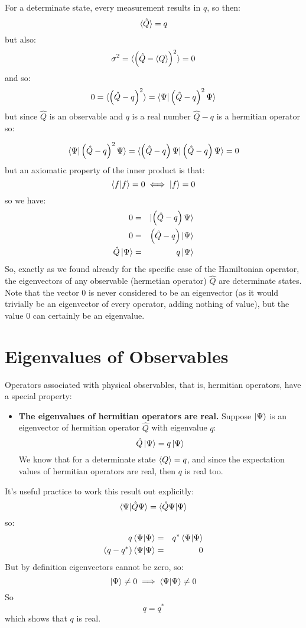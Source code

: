 \documentclass[12pt]{book}
\begin{document}
For a determinate state, every measurement results in $q$, so then:
$$\braket{\hat{Q}} = q$$
but also:
$$\sigma^2 = \braket{\left(\hat{Q}-\braket{Q}\right)^2} = 0$$
and so:
$$0 = \braket{\left(\hat{Q}-q\right)^2} = \braket{\Psi|\left(\hat{Q}-q\right)^2\Psi}$$
but since $\hat{Q}$ is an observable and $q$ is a real number $\hat{Q}-q$ is a hermitian operator so:

$$\braket{\Psi|\left(\hat{Q}-q\right)^2\Psi} = \braket{\left(\hat{Q}-q\right)\Psi|\left(\hat{Q}-q\right)\Psi} = 0$$
but an axiomatic property of the inner product is that:
$$\braket{f|f} = 0 \iff \ket{f} = 0$$
so we have:
\begin{eqnarray*}
 0 &=& \ket{\left(\hat{Q}-q\right)\Psi}\\
 0 &=& \left(\hat{Q}-q\right)\ket{\Psi}\\
\hat{Q}\ket{\Psi} &=& q \ket{\Psi}\\
\end{eqnarray*}
So, exactly as we found already for the specific case of the Hamiltonian operator, the eigenvectors of any observable (hermetian operator) $\hat{Q}$ are determinate states.
Note that the vector $0$ is never considered to be an eigenvector (as
it would trivially be an eigenvector of every operator, adding nothing
of value), but the value $0$ can certainly be an eigenvalue.  

\section{Eigenvalues of Observables}

Operators associated with physical observables, that is, hermitian operators, have a special property:
\begin{itemize}
\item {\bf The eigenvalues of hermitian operators are real.}  Suppose $\ket{\Psi}$ is an eigenvector of hermitian operator $\hat{Q}$ with eigenvalue $q$:
$$\hat{Q}\ket{\Psi} = q \ket{\Psi}$$
We know that for a determinate state $\braket{Q} = q$, and since the expectation values of hermitian operators are real, then $q$ is real too.  
\end{itemize}

\noindent
It's useful practice to work this result out explicitly:
$$\braket{\Psi | \hat{Q} \Psi} = \braket{\hat{Q} \Psi | \Psi}$$
so:
\begin{eqnarray*}
q \braket{\Psi | \Psi} &=& q^* \braket{\Psi | \Psi}\\
(q-q^*) \braket{\Psi | \Psi} &=& 0\\
\end{eqnarray*}
But by definition eigenvectors cannot be zero, so:
$$\ket{\Psi} \neq 0 \implies \braket{\Psi | \Psi} \neq 0$$
So 
$$q=q^*$$
which shows that $q$ is real.
\end{document}
